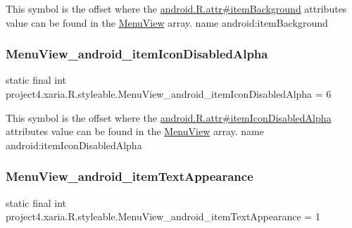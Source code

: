This symbol is the offset where the \hyperlink{}{android.\+R.\+attr\#item\+Background} attribute\textquotesingle{}s value can be found in the \hyperlink{classproject4_1_1xaria_1_1R_1_1styleable_ac1aef922f3c93d63048c893762b0dbda}{Menu\+View} array.  name android\+:item\+Background \mbox{\label{classproject4_1_1xaria_1_1R_1_1styleable_a33cd80d140efb3245ac24e8c44d445d0}} 
\subsubsection{\texorpdfstring{Menu\+View\+\_\+android\+\_\+item\+Icon\+Disabled\+Alpha}{MenuView\_android\_itemIconDisabledAlpha}}
{\footnotesize\ttfamily static final int project4.\+xaria.\+R.\+styleable.\+Menu\+View\+\_\+android\+\_\+item\+Icon\+Disabled\+Alpha = 6\hspace{0.3cm}{\ttfamily [static]}}

This symbol is the offset where the \hyperlink{}{android.\+R.\+attr\#item\+Icon\+Disabled\+Alpha} attribute\textquotesingle{}s value can be found in the \hyperlink{classproject4_1_1xaria_1_1R_1_1styleable_ac1aef922f3c93d63048c893762b0dbda}{Menu\+View} array.  name android\+:item\+Icon\+Disabled\+Alpha \mbox{\label{classproject4_1_1xaria_1_1R_1_1styleable_a3d955c47903c9650c0f2722cc42904cb}} 
\subsubsection{\texorpdfstring{Menu\+View\+\_\+android\+\_\+item\+Text\+Appearance}{MenuView\_android\_itemTextAppearance}}
{\footnotesize\ttfamily static final int project4.\+xaria.\+R.\+styleable.\+Menu\+View\+\_\+android\+\_\+item\+Text\+Appearance = 1\hspace{0.3cm}{\ttfamily [static]}}

